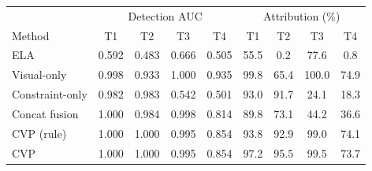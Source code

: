 \begin{tabular}{lcccc|cccc}
\toprule
 & \multicolumn{4}{c|}{Detection AUC} & \multicolumn{4}{c}{Attribution (\%)}\\
Method & T1 & T2 & T3 & T4 & T1 & T2 & T3 & T4\\
\midrule
ELA & 0.592 & 0.483 & 0.666 & 0.505 & 55.5 & 0.2 & 77.6 & 0.8\\
Visual-only & 0.998 & 0.933 & 1.000 & 0.935 & 99.8 & 65.4 & 100.0 & 74.9\\
Constraint-only & 0.982 & 0.983 & 0.542 & 0.501 & 93.0 & 91.7 & 24.1 & 18.3\\
Concat fusion & 1.000 & 0.984 & 0.998 & 0.814 & 89.8 & 73.1 & 44.2 & 36.6\\
CVP (rule) & 1.000 & 1.000 & 0.995 & 0.854 & 93.8 & 92.9 & 99.0 & 74.1\\
CVP & 1.000 & 1.000 & 0.995 & 0.854 & 97.2 & 95.5 & 99.5 & 73.7\\
\bottomrule
\end{tabular}

